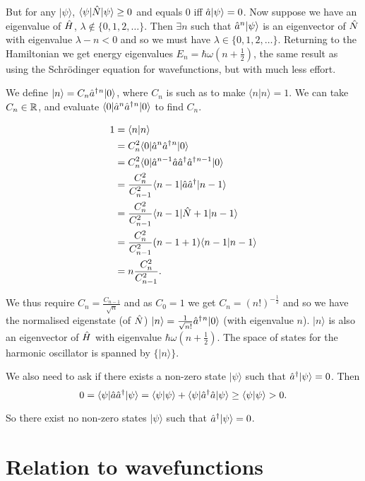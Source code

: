 \documentclass{notes}
\newcommand{\bra}[1]{\langle#1|}
\newcommand{\ket}[1]{|#1\rangle}
\newcommand{\scp}[2]{\langle#1|#2\rangle}
\begin{document}
But for any $\ket{\psi}$, $\bra{\psi}\Hat{N} \ket{\psi} \ge 0$ and
equals $0$ iff $\Hat{a} \ket{\psi} = 0$.  Now suppose we have an
eigenvalue of $\Hat{H}$, $\lambda \notin \{ 0,1,2,\dots \}$.  Then
$\exists n$ such that $\Hat{a}^n \ket{\psi}$ is an eigenvector of
$\Hat{N}$ with eigenvalue $\lambda - n < 0$ and so we must have
$\lambda \in \{ 0,1,2, \dots\}$.  Returning to the Hamiltonian we get
energy eigenvalues $E_n = \hbar \omega \left( n+ \tfrac{1}{2}
\right)$, the same result as using the Schr\"odinger equation for
wavefunctions, but with much less effort.

We define $\ket{n} = C_n \Hat{a}^\dag{}^n \ket{0}$, where $C_n$ is such as
to make $\scp{n}{n} = 1$.  We can take $C_n \in \mathbb{R}$, and evaluate
$\bra{0} \Hat{a}^n \Hat{a}^\dag{}^n \ket{0}$ to find $C_n$.

\begin{align*}
1 &= \scp{n}{n} \\
&= C_n^2 \bra{0} \Hat{a}^n \Hat{a}^\dag{}^n \ket{0} \\
&= C_n^2 \bra{0} \Hat{a}^{n-1} \Hat{a} \Hat{a}^\dag \Hat{a}^\dag{}^{n-1}
\ket{0} \\
&= \frac{C_n^2}{C_{n-1}^2} \bra{n-1} \Hat{a} \Hat{a}^\dag \ket{n-1} \\
&= \frac{C_n^2}{C_{n-1}^2} \bra{n-1} \Hat{N} + 1 \ket{n-1} \\
&= \frac{C_n^2}{C_{n-1}^2} (n - 1 + 1) \scp{n-1}{n-1} \\
&= n \frac{C_n^2}{C_{n-1}^2}.
\end{align*}

We thus require $C_n = \frac{C_{n-1}}{\sqrt{n}}$ and as $C_0 = 1$ we
get $C_n = \left( n! \right)^{-\frac{1}{2}}$ and so we have the
normalised eigenstate (of $\Hat{N}$) $\ket{n} = \frac{1}{\sqrt{n!}}
\Hat{a}^\dag{}^n \ket{0}$ (with eigenvalue $n$).  $\ket{n}$ is also an
eigenvector of $\Hat{H}$ with eigenvalue $\hbar \omega \left( n +
  \frac{1}{2} \right)$.  The space of states for the harmonic
oscillator is spanned by $\{\ket{n}\}$.

We also need to ask if there exists a non-zero state $\ket{\psi}$ such that
$\Hat{a}^\dag \ket{\psi} = 0$.  Then
\[
0 = \bra{\psi} \Hat{a} \Hat{a}^\dag \ket{\psi} = \scp{\psi}{\psi}
+ \bra{\psi} \Hat{a}^\dag \Hat{a} \ket{\psi} \ge \scp{\psi}{\psi} > 0.
\]

So there exist no non-zero states $\ket{\psi}$ such that
$\Hat{a}^\dag \ket{\psi} = 0$.

\section{Relation to wavefunctions}
\end{document}
